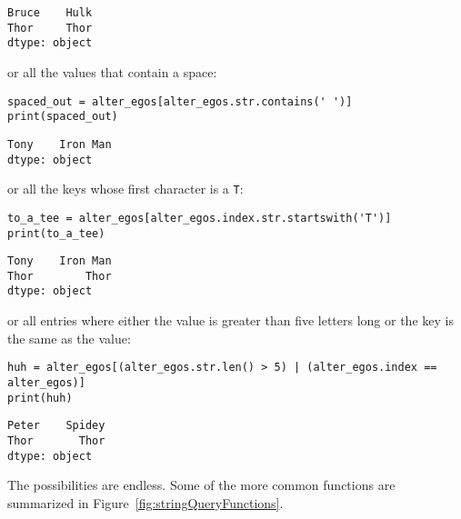 \begin{Verbatim}[fontsize=\small,samepage=true,frame=leftline,framesep=5mm,framerule=1mm]
Bruce    Hulk
Thor     Thor
dtype: object
\end{Verbatim}

or all the values that contain a space:

\begin{Verbatim}[fontsize=\small,samepage=true,frame=single,framesep=3mm]
spaced_out = alter_egos[alter_egos.str.contains(' ')]
print(spaced_out)
\end{Verbatim}
\vspace{-.3in}

\begin{Verbatim}[fontsize=\small,samepage=true,frame=leftline,framesep=5mm,framerule=1mm]
Tony    Iron Man
dtype: object
\end{Verbatim}

or all the keys whose first character is a \texttt{T}:

\begin{Verbatim}[fontsize=\small,samepage=true,frame=single,framesep=3mm]
to_a_tee = alter_egos[alter_egos.index.str.startswith('T')]
print(to_a_tee)
\end{Verbatim}
\vspace{-.3in}

\begin{Verbatim}[fontsize=\small,samepage=true,frame=leftline,framesep=5mm,framerule=1mm]
Tony    Iron Man
Thor        Thor
dtype: object
\end{Verbatim}

or all entries where either the value is greater than five letters long or the
key is the same as the value:

\begin{Verbatim}[fontsize=\scriptsize,samepage=true,frame=single,framesep=3mm]
huh = alter_egos[(alter_egos.str.len() > 5) | (alter_egos.index == alter_egos)]
print(huh)
\end{Verbatim}
\vspace{-.3in}

\begin{Verbatim}[fontsize=\scriptsize,samepage=true,frame=leftline,framesep=5mm,framerule=1mm]
Peter    Spidey
Thor       Thor
dtype: object
\end{Verbatim}

The possibilities are endless. Some of the more common functions are summarized
in Figure~\ref{fig:stringQueryFunctions}.

